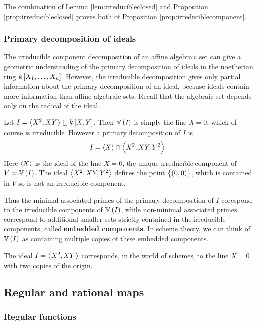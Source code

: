 The combination of Lemma \ref{lem:irreducibleclosed} and Proposition \ref{prop:irreducibleclosed} proves both of Proposition \ref{prop:irreduciblecomponent}.

\pagebreak

\subsubsection{Primary decomposition of ideals}

The irreducible component decomposition of an affine algebraic set can give a geometric understanding of the primary decomposition of ideals in the noetherian ring $ k\sbr{X_1, \dots, X_n} $. However, the irreducible decomposition gives only partial information about the primary decomposition of an ideal, because ideals contain more information than affine algebraic sets. Recall that the algebraic set depends only on the radical of the ideal.

\begin{example*}
Let $ I = \abr{X^2, XY} \subseteq k\sbr{X, Y} $. Then $ \VV\br{I} $ is simply the line $ X = 0 $, which of course is irreducible. However a primary decomposition of $ I $ is
$$ I = \left\langle X \right\rangle \cap \left\langle X^2, XY, Y^2 \right\rangle. $$
Here $ \left\langle X \right\rangle $ is the ideal of the line $ X = 0 $, the unique irreducible component of $ V = \VV\br{I} $. The ideal $ \left\langle X^2, XY, Y^2 \right\rangle $ defines the point $ \cbr{\br{0, 0}} $, which is contained in $ V $ so is not an irreducible component.
\end{example*}

Thus the minimal associated primes of the primary decomposition of $ I $ corespond to the irreducible components of $ \VV\br{I} $, while non-minimal associated primes correspond to additional smaller sets strictly contained in the irreducible components, called \textbf{embedded components}. In scheme theory, we can think of $ \VV\br{I} $ as containing multiple copies of these embedded components.

\begin{example*}
The ideal $ I = \left\langle X^2, XY \right\rangle $ corresponds, in the world of schemes, to the line $ X = 0 $ with two copies of the origin.
\end{example*}

\subsection{Regular and rational maps}

\subsubsection{Regular functions}


